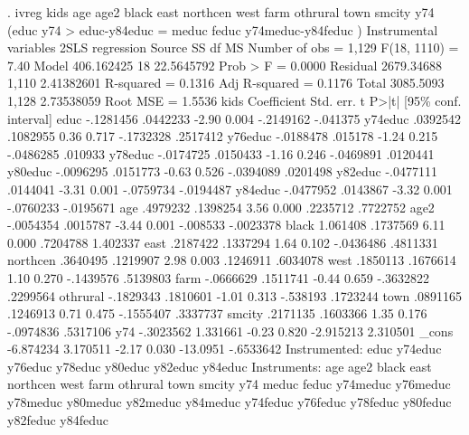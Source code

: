 . ivreg kids age age2 black east northcen west farm othrural town smcity y74 (educ y74
> educ-y84educ = meduc feduc y74meduc-y84feduc )
{\smallskip}
Instrumental variables 2SLS regression
{\smallskip}
      Source {\VBAR}       SS           df       MS      Number of obs   =     1,129
   F(18, 1110)     =      7.40
       Model {\VBAR}  406.162425        18  22.5645792   Prob > F        =    0.0000
    Residual {\VBAR}  2679.34688     1,110  2.41382601   R-squared       =    0.1316
   Adj R-squared   =    0.1176
       Total {\VBAR}   3085.5093     1,128  2.73538059   Root MSE        =    1.5536
{\smallskip}
        kids {\VBAR} Coefficient  Std. err.      t    P>|t|     [95\% conf. interval]
        educ {\VBAR}  -.1281456   .0442233    -2.90   0.004    -.2149162    -.041375
     y74educ {\VBAR}   .0392542   .1082955     0.36   0.717    -.1732328    .2517412
     y76educ {\VBAR}  -.0188478    .015178    -1.24   0.215    -.0486285     .010933
     y78educ {\VBAR}  -.0174725   .0150433    -1.16   0.246    -.0469891    .0120441
     y80educ {\VBAR}  -.0096295   .0151773    -0.63   0.526    -.0394089    .0201498
     y82educ {\VBAR}  -.0477111   .0144041    -3.31   0.001    -.0759734   -.0194487
     y84educ {\VBAR}  -.0477952   .0143867    -3.32   0.001    -.0760233   -.0195671
         age {\VBAR}   .4979232   .1398254     3.56   0.000     .2235712    .7722752
        age2 {\VBAR}  -.0054354   .0015787    -3.44   0.001     -.008533   -.0023378
       black {\VBAR}   1.061408   .1737569     6.11   0.000     .7204788    1.402337
        east {\VBAR}   .2187422   .1337294     1.64   0.102    -.0436486    .4811331
    northcen {\VBAR}   .3640495   .1219907     2.98   0.003     .1246911    .6034078
        west {\VBAR}   .1850113   .1676614     1.10   0.270    -.1439576    .5139803
        farm {\VBAR}  -.0666629   .1511741    -0.44   0.659    -.3632822    .2299564
    othrural {\VBAR}  -.1829343   .1810601    -1.01   0.313     -.538193    .1723244
        town {\VBAR}   .0891165   .1246913     0.71   0.475    -.1555407    .3337737
      smcity {\VBAR}   .2171135   .1603366     1.35   0.176    -.0974836    .5317106
         y74 {\VBAR}  -.3023562   1.331661    -0.23   0.820    -2.915213    2.310501
       _cons {\VBAR}  -6.874234   3.170511    -2.17   0.030     -13.0951   -.6533642
Instrumented: educ y74educ y76educ y78educ y80educ y82educ y84educ
 Instruments: age age2 black east northcen west farm othrural town smcity
              y74 meduc feduc y74meduc y76meduc y78meduc y80meduc y82meduc
              y84meduc y74feduc y76feduc y78feduc y80feduc y82feduc y84feduc
{\smallskip}

